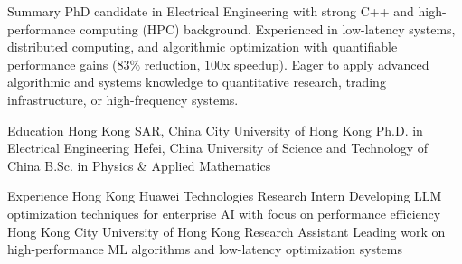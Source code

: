 \documentclass[caps, english]{financecv}
\begin{document}
\begin{cvsection}{Summary}
PhD candidate in Electrical Engineering with strong C++ and high-performance computing (HPC) background. Experienced in low-latency systems, distributed computing, and algorithmic optimization with quantifiable performance gains ($83\%$ reduction, $100$x speedup). Eager to apply advanced algorithmic and systems knowledge to quantitative research, trading infrastructure, or high-frequency systems.
\end{cvsection}

\begin{cvsection}{Education}
{Hong Kong SAR, China}
{City University of Hong Kong}
{Ph.D. in Electrical Engineering}
{}
{}
{}
{}
{Hefei, China}
{University of Science and Technology of China}
{B.Sc. in Physics \& Applied Mathematics}
{}
{}
{}
{}
\end{cvsection}

\begin{cvsection}{Experience}
{Hong Kong}
{Huawei Technologies}
{Research Intern}
{Developing LLM optimization techniques for enterprise AI with focus on performance efficiency}
{}
{}
{}
{Hong Kong}
{City University of Hong Kong}
{Research Assistant}
{Leading work on high-performance ML algorithms and low-latency optimization systems}
{}
{}
{}
\end{cvsection}
\end{document}
